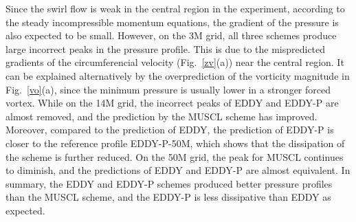 Since the swirl flow is weak in the central region in the experiment, according to the steady incompressible momentum equations, the gradient of the pressure is also expected to be small. However, on the 3M grid, all three schemes produce large incorrect peaks in the pressure profile. This is due to the mispredicted gradients of the circumferencial velocity (Fig.~\ref{zv}(a)) near the central region. It can be explained alternatively by the overprediction of the vorticity magnitude in Fig.~\ref{vo}(a), since the minimum pressure is usually lower in a stronger forced vortex. While on the 14M grid, the incorrect peaks of EDDY and EDDY-P are almost removed, and the prediction by the MUSCL scheme has improved. Moreover, compared to the prediction of EDDY, the prediction of EDDY-P is closer to the reference profile EDDY-P-50M, which shows that the dissipation of the scheme is further reduced. On the 50M grid, the peak for MUSCL continues to diminish, and the predictions of EDDY and EDDY-P are almost equivalent. In summary, the EDDY and EDDY-P schemes produced better pressure profiles than the MUSCL scheme, and the EDDY-P is less dissipative than EDDY as expected. 
